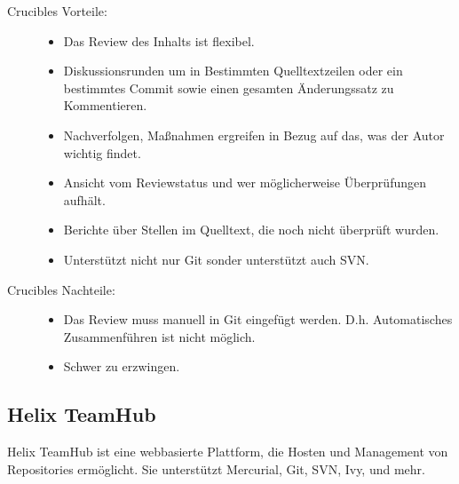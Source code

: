 \begin{description}
	\item [Crucibles Vorteile:] \hfill
	\begin{itemize}
		\item Das Review des Inhalts ist flexibel.
		\item Diskussionsrunden um in Bestimmten Quelltextzeilen oder ein bestimmtes Commit sowie einen gesamten Änderungssatz zu Kommentieren.
		\item Nachverfolgen, Maßnahmen ergreifen in Bezug auf das, was der Autor wichtig findet.
		\item Ansicht vom Reviewstatus und wer möglicherweise Überprüfungen aufhält.
		\item Berichte über Stellen im Quelltext, die noch nicht überprüft wurden.
		\item Unterstützt nicht nur Git sonder unterstützt auch \ac{SVN}.
	\end{itemize}
	
	\item [Crucibles Nachteile:] \hfill
	\begin{itemize}
		\item Das Review muss manuell in Git eingefügt werden. D.h. Automatisches Zusammenführen ist nicht möglich.
		\item Schwer zu erzwingen.
	\end{itemize}
\end{description}

\subsection{Helix TeamHub}
\label{subsec:HelixTeamHub}

Helix TeamHub ist eine webbasierte Plattform, die Hosten und Management von Repositories ermöglicht. Sie unterstützt Mercurial, Git, \ac{SVN}, Ivy, und mehr.

